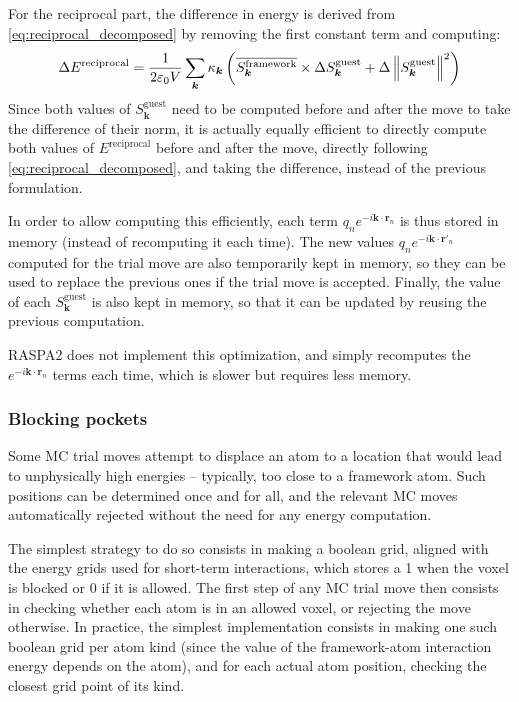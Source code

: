 \documentclass[main.tex]{subfiles}
\begin{document}
For the reciprocal part, the difference in energy is derived from \cref{eq:reciprocal_decomposed} by removing the first constant term and computing:
\[\Delta E^\text{reciprocal} = \frac1{2\varepsilon_0V} \sum_{\boldsymbol k}\kappa_{\boldsymbol k} \left(
\overline{S_{\boldsymbol k}^\text{framework}}\times\Delta S_{\boldsymbol k}^\text{guest} +
\Delta \left\|S_{\boldsymbol k}^\text{guest}\right\|^2
\right)\label{eq:reciprocal_move}\]
Since both values of $S_{\boldsymbol k}^\text{guest}$ need to be computed before and after the move to take the difference of their norm, it is actually equally efficient to directly compute both values of $E^\text{reciprocal}$ before and after the move, directly following \cref{eq:reciprocal_decomposed}, and taking the difference, instead of the previous formulation.

In order to allow computing this efficiently, each term $q_ne^{-i\boldsymbol k\cdot\boldsymbol r_n}$ is thus stored in memory (instead of recomputing it each time). The new values $q_ne^{-i\boldsymbol k\cdot\boldsymbol{r}'_n}$ computed for the trial move are also temporarily kept in memory, so they can be used to replace the previous ones if the trial move is accepted. Finally, the value of each $S_{\boldsymbol{k}}^\text{guest}$ is also kept in memory, so that it can be updated by reusing the previous computation.

RASPA2 does not implement this optimization, and simply recomputes the $e^{-i\boldsymbol k\cdot\boldsymbol r_n}$ terms each time, which is slower but requires less memory.

\subsubsection{Blocking pockets}
\label{blockingpockets}

Some MC trial moves attempt to displace an atom to a location that would lead to unphysically high energies -- typically, too close to a framework atom. Such positions can be determined once and for all, and the relevant MC moves automatically rejected without the need for any energy computation.

The simplest strategy to do so consists in making a boolean grid, aligned with the energy grids used for short-term interactions, which stores a 1 when the voxel is blocked or 0 if it is allowed. The first step of any MC trial move then consists in checking whether each atom is in an allowed voxel, or rejecting the move otherwise. In practice, the simplest implementation consists in making one such boolean grid per atom kind (since the value of the framework-atom interaction energy depends on the atom), and for each actual atom position, checking the closest grid point of its kind.
\end{document}
